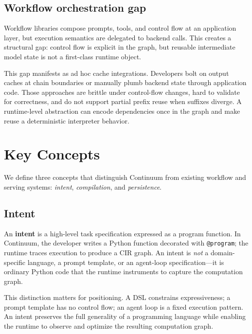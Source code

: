 \documentclass[10pt,twocolumn]{article}
\begin{document}
\subsection{Workflow orchestration gap}
Workflow libraries compose prompts, tools, and control flow at an application layer, but execution semantics are delegated to backend calls. This creates a structural gap: control flow is explicit in the graph, but reusable intermediate model state is not a first-class runtime object.

This gap manifests as ad hoc cache integrations. Developers bolt on output caches at chain boundaries or manually plumb backend state through application code. Those approaches are brittle under control-flow changes, hard to validate for correctness, and do not support partial prefix reuse when suffixes diverge. A runtime-level abstraction can encode dependencies once in the graph and make reuse a deterministic interpreter behavior.

\section{Key Concepts}

We define three concepts that distinguish Continuum from existing workflow and serving systems: \emph{intent}, \emph{compilation}, and \emph{persistence}.

\subsection{Intent}
An \textbf{intent} is a high-level task specification expressed as a program function. In Continuum, the developer writes a Python function decorated with \texttt{@program}; the runtime traces execution to produce a CIR graph. An intent is \emph{not} a domain-specific language, a prompt template, or an agent-loop specification---it is ordinary Python code that the runtime instruments to capture the computation graph.

This distinction matters for positioning. A DSL constrains expressiveness; a prompt template has no control flow; an agent loop is a fixed execution pattern. An intent preserves the full generality of a programming language while enabling the runtime to observe and optimize the resulting computation graph.
\end{document}
